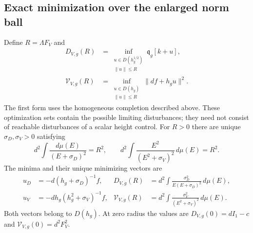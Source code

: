 \documentclass[aps,prl,reprint,superscriptaddress,longbibliography]{revtex4-2}
\begin{document}
\subsection{Exact minimization over the enlarged norm ball}
\label{sc:relaxation}

Define $R=\Lambda F_V$ and
\begin{align}
 D_{V,g}(R)&=\inf_{\substack{u\in D(h_g^{1/2})\\\|u\|\le R}}
                  \mathfrak q_g[k+u],\\
 \mathcal V_{V,g}(R)&=\inf_{\substack{u\in D(h_g)\\\|u\|\le R}}
                  \|df+h_gu\|^2.
 \label{sc:relaxed-definition}
\end{align}
The first form uses the homogeneous completion described above.
These optimization sets contain the possible limiting disturbances;
they need not consist of reachable disturbances of a scalar height
control. For $R>0$ there are unique $\sigma_D,\sigma_V>0$ satisfying
\begin{equation}
 d^2\int\frac{d\mu(E)}{(E+\sigma_D)^2}=R^2,\qquad
 d^2\int\frac{E^2}{(E^2+\sigma_V)^2}\,d\mu(E)=R^2.
 \label{sc:multipliers}
\end{equation}
The minima and their unique minimizing vectors are
\begin{align}
 u_D&=-d(h_g+\sigma_D)^{-1}f,
 &D_{V,g}(R)&=d^2\int\frac{\sigma_D^2}{E(E+\sigma_D)^2}\,d\mu(E),\\
 u_V&=-dh_g(h_g^2+\sigma_V)^{-1}f,
 &\mathcal V_{V,g}(R)&=d^2\int\frac{\sigma_V^2}{(E^2+\sigma_V)^2}\,d\mu(E).
 \label{sc:minima}
\end{align}
Both vectors belong to $D(h_g)$. At zero radius the values are
$D_{V,g}(0)=dI_1-c$ and $\mathcal V_{V,g}(0)=d^2F_V^2$.
\end{document}
